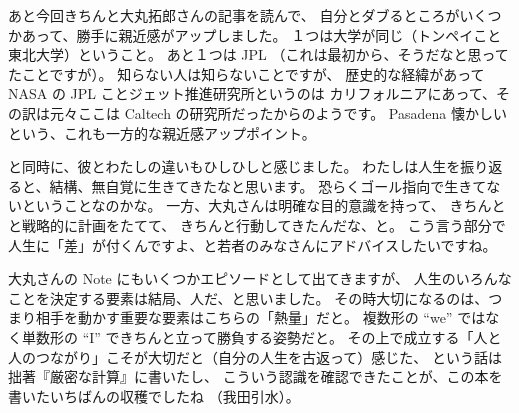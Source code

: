 \documentclass[dvipdfmx,autodetect-engine,10pt,b5paper,papersize,openany,dvipsnames]{jsbook}
\begin{document}
\begin{multicols}{2}
あと今回きちんと大丸拓郎さんの記事を読んで、
自分とダブるところがいくつかあって、勝手に親近感がアップしました。
１つは大学が同じ（トンペイこと東北大学）ということ。
あと１つは JPL （これは最初から、そうだなと思ってたことですが）。
知らない人は知らないことですが、
歴史的な経緯があって NASA の JPL ことジェット推進研究所というのは
カリフォルニアにあって、その訳は元々ここは Caltech の研究所だったからのようです。
Pasadena 懐かしいという、これも一方的な親近感アップポイント。


と同時に、彼とわたしの違いもひしひしと感じました。
わたしは人生を振り返ると、結構、無自覚に生きてきたなと思います。
恐らくゴール指向で生きてないということなのかな。
一方、大丸さんは明確な目的意識を持って、
きちんとと戦略的に計画をたてて、
きちんと行動してきたんだな、と。
こう言う部分で人生に「差」が付くんですよ、と若者のみなさんにアドバイスしたいですね。


大丸さんの Note にもいくつかエピソードとして出てきますが、
人生のいろんなことを決定する要素は結局、人だ、と思いました。
その時大切になるのは、つまり相手を動かす重要な要素はこちらの「熱量」だと。
複数形の ``we'' ではなく単数形の ``I'' できちんと立って勝負する姿勢だと。
その上で成立する「人と人のつながり」こそが大切だと（自分の人生を古返って）感じた、
という話は拙著『厳密な計算』に書いたし、
こういう認識を確認できたことが、この本を書いたいちばんの収穫でしたね
（我田引水）。



\end{multicols}
\end{document}
